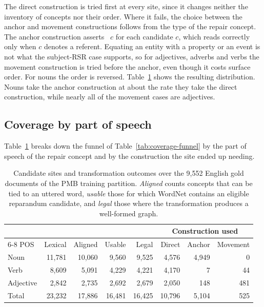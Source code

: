 \documentclass{article}
\begin{document}
The direct construction is tried first at every site, since it changes neither
the inventory of concepts nor their order. Where it fails, the choice between
the anchor and movement constructions follows from the type of the repair
concept. The anchor construction asserts
~$c$ for each candidate $c$, which reads correctly
only when $c$ denotes a referent. Equating an entity with a property or an
event is not what the subject-RSR case supports, so for adjectives, adverbs
and verbs the movement construction is tried before the anchor, even though it
costs surface order. For nouns the order is reversed.
Table~\ref{tab:devices-coverage} shows the resulting distribution. Nouns take
the anchor construction at about the rate they take the direct construction,
while nearly all of the movement cases are adjectives.

\subsection{Coverage by part of speech}
\label{app:devices-coverage}

Table~\ref{tab:devices-coverage} breaks down the funnel of
Table~\ref{tab:coverage-funnel} by the part of speech of the repair concept
and by the construction the site ended up needing.

\begin{table}[ht]
\centering
\small
\begin{tabular}{@{}lrrrrrrr@{}}
\toprule
& & & & & \multicolumn{3}{c}{Construction used} \\
\cmidrule(l){6-8}
POS & Lexical & Aligned & Usable & Legal & Direct & Anchor & Movement \\
\midrule
Noun      & 11,781 & 10,060 & 9,560 & 9,525 & 4,576 & 4,949 &   0 \\
Verb      &  8,609 &  5,091 & 4,229 & 4,221 & 4,170 &     7 &  44 \\
Adjective &  2,842 &  2,735 & 2,692 & 2,679 & 2,050 &   148 & 481 \\
\midrule
Total     & 23,232 & 17,886 & 16,481 & 16,425 & 10,796 & 5,104 & 525 \\
\bottomrule
\end{tabular}
\caption{Candidate sites and transformation outcomes over the 9,552 English
gold documents of the PMB training partition. \emph{Aligned} counts concepts
that can be tied to an uttered word, \emph{usable} those for which WordNet
contains an eligible reparandum candidate, and \emph{legal} those where the transformation produces a
well-formed graph.}
\label{tab:devices-coverage}
\end{table}
\end{document}
